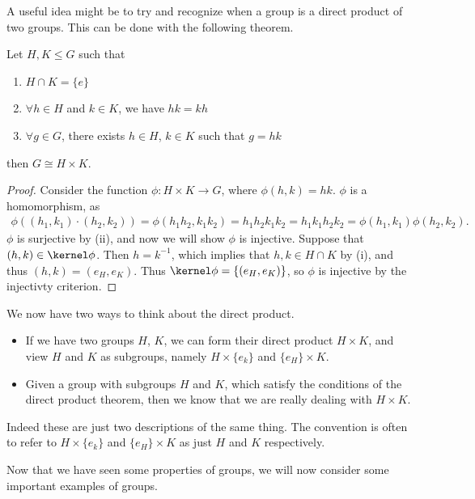 A useful idea might be to try and recognize when a group is a direct product of two groups. This can be done with the following theorem.

\begin{theorem}
	Let $H, K \leq G$ such that
	\begin{enumerate}[label=(\roman*)]
		\item $H \cap K = \{e\}$
		\item $\forall h \in H$ and $k \in K$, we have $hk = kh$
		\item $\forall g \in G$, there exists $h \in H$, $k \in K$ such that $g = hk$
	\end{enumerate}
	then $G \cong H \times K$.
\end{theorem}
% 
\begin{proof}
	Consider the function $\phi : H \times K \rightarrow G$, where $\phi(h, k) = hk$.
	$\phi$ is a homomorphism, as
	\begin{align*}
		\phi((h_1, k_1) \cdot (h_2, k_2)) = \phi(h_1 h_2, k_1 k_2) = h_1 h_2 k_1 k_2 = h_1 k_1 h_2 k_2 = \phi(h_1, k_1) \phi(h_2, k_2).
	\end{align*}
	$\phi$ is surjective by (ii), and now we will show $\phi$ is injective.
	Suppose that $(h, k) \in \kernel\phi$. Then $h = k^{-1}$, which implies that $h, k \in H \cap K$ by (i), and thus $(h, k) = (e_H, e_K)$. Thus $\kernel \phi = \{(e_H, e_K)\}$, so $\phi$ is injective by the injectivty criterion.
\end{proof}

We now have two ways to think about the direct product. 
\begin{itemize}
	\item If we have two groups $H$, $K$, we can form their direct product $H \times K$, and view $H$ and $K$ as subgroups, namely $H \times \{e_k\}$ and $\{e_H\} \times K$.
	\item Given a group with subgroups $H$ and $K$, which satisfy the conditions of the direct product theorem, then we know that we are really dealing with $H \times K$.
\end{itemize}
Indeed these are just two descriptions of the same thing. The convention is often to refer to $H \times \{e_k\}$ and $\{e_H\} \times K$ as just $H$ and $K$ respectively.


Now that we have seen some properties of groups, we will now consider some important examples of groups.


